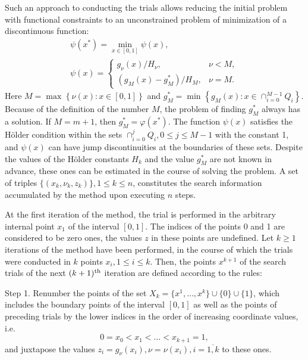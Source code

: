 \documentclass[runningheads]{llncs}
\begin{document}
Such an approach to conducting the trials allows reducing the initial problem with functional
constraints to an unconstrained problem of minimization of a discontinuous function:
\begin{displaymath}
  \begin{array}{lr}
    \psi (x^{*})=\min_{x\in [0,1]}\psi (x), \\
    \psi (x)={\begin{cases}g_{\nu }(x)/H_{\nu },&\nu <M,\\(g_{M}(x)-g_{M}^{*})/H_{M},&\nu
=M.\end{cases}}
  \end{array}
\end{displaymath}
Here \(M=\max_{}^{}\left\{\nu (x):x\in [0,1]\right\}\) and \(g_{M}^{*}=\min
_{}^{}\left\{g_{M}(x):x\in \cap _{i=0}^{M-1}Q_{i}\right\}\).
Because of the definition of the number \(M\), the problem of finding \(g_{M}^{*}\) always
has a solution. If \(M=m+1\), then \(g_{M}^{*}=\varphi(x^{*})\).
The function \(\psi (x)\) satisfies the H\"{o}lder condition within the sets
\(\cap _{i=0}^{j}Q_{i},0\leq j\leq M-1\)
with the constant 1, and \(\psi (x)\) can have jump discontinuities at the boundaries
of these sets.
Despite the values of the H\"{o}lder constants \(H_k\) and the value \(g_{M}^{*}\) are not
known in advance, these ones can be estimated in the course of solving the problem.
A set of triples \(\{(x_k,\nu_k,z_k)\}, 1\leqslant k\leqslant n\), constitutes the search information
accumulated by the method upon executing \(n\) steps.

At the first iteration of the method, the trial is performed in the arbitrary internal point \(x_1\) of
the interval \([0,1]\).
The indices of the points 0 and 1 are considered to be zero ones, the values \(z\) in these points
are undefined.
Let \(k\geqslant 1\) iterations of the method have been performed, in the course of which the
trials were conducted in \(k\) points \(x_i, 1\leqslant i\leqslant k\).
Then, the points \(x^{k+1}\) of the search trials of the next \((k+1)^{\rm th}\) iteration are
defined according to the rules:

Step 1. Renumber the points of the set \(X_k=\{x^1,\dotsc,x^k\}\cup\{0\}\cup\{1\}\), which
includes the boundary points of the interval \([0,1]\) as well as the points of preceding trials by
the lower indices in the order of increasing coordinate values, i.e.
\begin{equation}
  \label{eq:points}
  0=x_0<x_1<\dotsc<x_{k+1}=1,
\end{equation}
and juxtapose the values \(z_{i}=g_{\nu }(x_{i}),\nu =\nu (x_{i}),i={\overline {1,k}}\) to these
ones.
\end{document}
